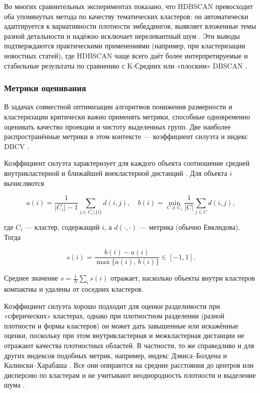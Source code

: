 Во многих сравнительных экспериментах показано, что HDBSCAN превосходит оба упомянутых метода по качеству
тематических кластеров: он автоматически адаптируется к вариативности плотности эмбеддингов, выявляет вложенные
темы разной детальности и надёжно исключает нерелевантный шум \parencite{HDBSCAN2017software, HDBSCAN2013}.
Эти выводы подтверждаются практическими применениями (например, при кластеризации новостных статей),
где HDBSCAN чаще всего даёт более интерпретируемые и стабильные результаты по сравнению с K-Средних
или «плоским» DBSCAN \parencite{BERTopic2022}.

\subsubsection{Метрики оценивания}
В задачах совместной оптимизации алгоритмов понижения размерности и кластеризации критически важно применять
метрики, способные одновременно оценивать качество проекции и чистоту выделенных групп. Две наиболее
распространённые метрики в этом контексте --- коэффициент силуэта \parencite{silouette1987} и индекс DBCV \parencite{dbcv2014density}.

Коэффициент силуэта характеризует для каждого объекта соотношение средней внутрикластерной и ближайшей
внекластерной дистанций \parencite{silouette1987}. Для объекта $i$ вычисляются

\begin{equation}
    a(i)=\frac{1}{|C_i|-1}\sum_{j\in C_i\setminus\{i\}}d(i,j),\quad b(i)=\min_{C\neq C_i}\frac{1}{|C|}\sum_{j\in C}d(i,j),
\end{equation}

где $C_i$ --- кластер, содержащий $i$, а $d(\cdot,\cdot)$ --- метрика (обычно Евклидова). Тогда

\begin{equation}
    s(i)=\frac{b(i)-a(i)}{\max\{a(i),\,b(i)\}}\in[-1,1].
\end{equation}

Среднее значение $s=\frac1N\sum_i s(i)$ отражает, насколько объекты внутри кластеров компактны и удалены
от соседних кластеров.

Коэффициент силуэта хорошо подходит для оценки разделимости при «сферических» кластерах, однако при плотностном
разделении (разной плотности и формы кластеров) он может дать завышенные или искажённые оценки, поскольку
при этом внутрикластерная и межкластерная дистанции не отражают качества плотностных областей. В частности,
то же справедливо и для других индексов подобных метрик, например, индекс Дэвиса–Болдена и Калински–Харабаша
\parencite{mmj2023liu}. Все они опираются на средние расстояния до центров или дисперсию по кластерам и
не учитывают неоднородность плотности и выделение шума \parencite{liu2024newindexclusteringevaluation}.

